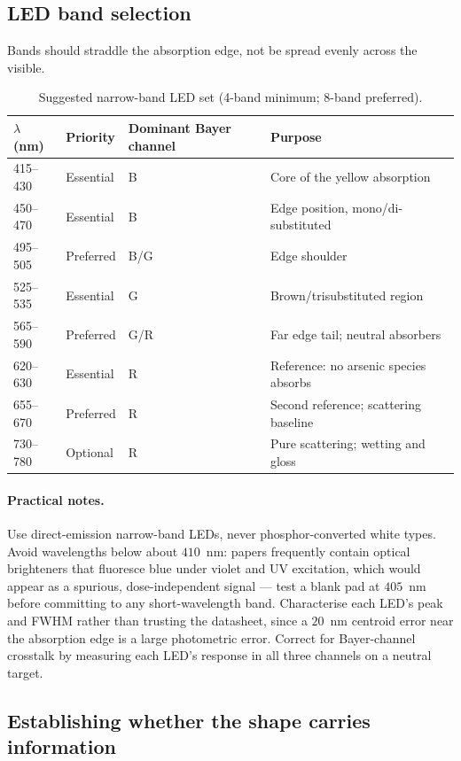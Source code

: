 \documentclass[11pt,a4paper]{article}
\begin{document}
\subsection{LED band selection}

Bands should straddle the absorption edge, not be spread evenly across the
visible.

\begin{table}[h]
\centering
\caption{Suggested narrow-band LED set (4-band minimum; 8-band preferred).}
\begin{tabular}{llll}
\toprule
$\lambda$ (nm) & Priority & Dominant Bayer channel & Purpose \\
\midrule
415--430 & Essential & B & Core of the yellow absorption \\
450--470 & Essential & B & Edge position, mono/di-substituted \\
495--505 & Preferred & B/G & Edge shoulder \\
525--535 & Essential & G & Brown/trisubstituted region \\
565--590 & Preferred & G/R & Far edge tail; neutral absorbers \\
620--630 & Essential & R & Reference: no arsenic species absorbs \\
655--670 & Preferred & R & Second reference; scattering baseline \\
730--780 & Optional  & R & Pure scattering; wetting and gloss \\
\bottomrule
\end{tabular}
\end{table}

\paragraph{Practical notes.}
Use direct-emission narrow-band LEDs, never phosphor-converted white types.
Avoid wavelengths below about $410$~nm: papers frequently contain optical
brighteners that fluoresce blue under violet and UV excitation, which would
appear as a spurious, dose-independent signal --- test a blank pad at
$405$~nm before committing to any short-wavelength band. Characterise each
LED's peak and FWHM rather than trusting the datasheet, since a $20$~nm
centroid error near the absorption edge is a large photometric error.
Correct for Bayer-channel crosstalk by measuring each LED's response in all
three channels on a neutral target.

\subsection{Establishing whether the shape carries information}
\end{document}
